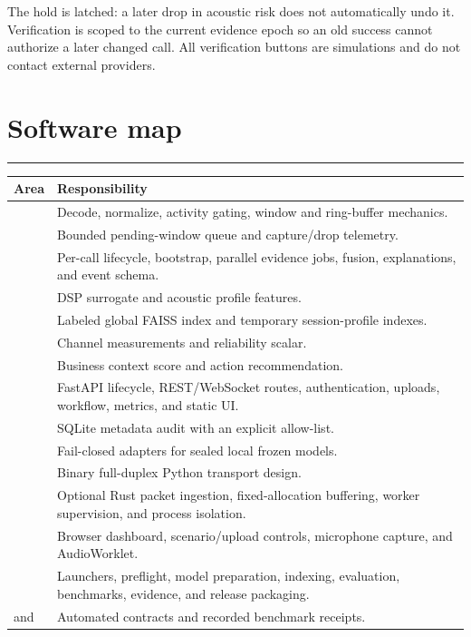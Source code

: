 \documentclass[10pt,a4paper]{article}
\newcommand{\sectionrule}{\vspace{-2mm}\textcolor{blue}{\rule{22mm}{1.2pt}}\vspace{2mm}}
\begin{document}
The hold is latched: a later drop in acoustic risk does not automatically undo it. Verification is scoped to the current evidence epoch so an old success cannot authorize a later changed call. All verification buttons are simulations and do not contact external providers.

\section{Software map}
\sectionrule

\begin{tabularx}{\linewidth}{@{}L{42mm}Y@{}}
\toprule
\textbf{Area} & \textbf{Responsibility}\\
\midrule
{} & Decode, normalize, activity gating, window and ring-buffer mechanics.\\
 & Bounded pending-window queue and capture/drop telemetry.\\
 & Per-call lifecycle, bootstrap, parallel evidence jobs, fusion, explanations, and event schema.\\
 & DSP surrogate and acoustic profile features.\\
 & Labeled global FAISS index and temporary session-profile indexes.\\
 & Channel measurements and reliability scalar.\\
 & Business context score and action recommendation.\\
 & FastAPI lifecycle, REST/WebSocket routes, authentication, uploads, workflow, metrics, and static UI.\\
 & SQLite metadata audit with an explicit allow-list.\\
 & Fail-closed adapters for sealed local frozen models.\\
 & Binary full-duplex Python transport design.\\
 & Optional Rust packet ingestion, fixed-allocation buffering, worker supervision, and process isolation.\\
 & Browser dashboard, scenario/upload controls, microphone capture, and AudioWorklet.\\
 & Launchers, preflight, model preparation, indexing, evaluation, benchmarks, evidence, and release packaging.\\
 and  & Automated contracts and recorded benchmark receipts.\\
\bottomrule
\end{tabularx}
\end{document}
